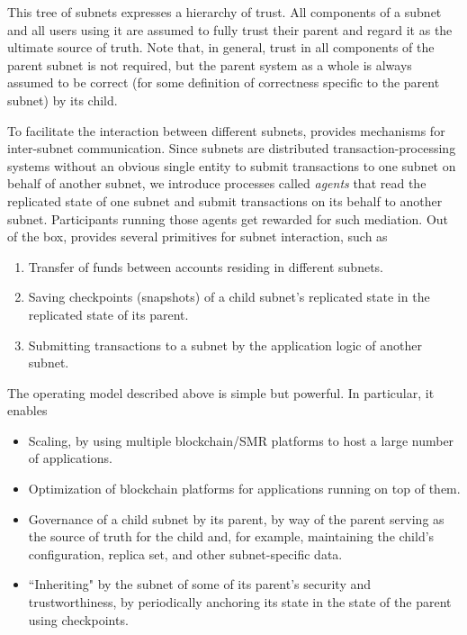 This tree of subnets expresses a hierarchy of trust.
All components of a subnet and all users using it are assumed to fully trust their parent  and regard it as the ultimate source of truth.
Note that, in general, trust in all components of the parent subnet is not required, but the parent system as a whole is always assumed to be correct (for some definition of correctness specific to the parent subnet) by its child.

To facilitate the interaction between different subnets, \ipc provides mechanisms for inter-subnet communication.
Since subnets are distributed transaction-processing systems
without an obvious single entity to submit transactions to one subnet on behalf of another subnet,
we introduce processes called \emph{\ipc agents} that read the replicated state of one subnet and submit transactions on its behalf to another subnet.
Participants running those \ipc agents get rewarded for such mediation.
Out of the box, \ipc provides several primitives for subnet interaction, such as
\begin{enumerate}
    \item Transfer of funds between accounts residing in different subnets.
    \item Saving checkpoints (snapshots) of a child subnet's replicated state in the replicated state of its parent.
    \item Submitting transactions to a subnet by the application logic of another subnet.
\end{enumerate}

The operating model described above is simple but powerful.
In particular, it enables
\begin{itemize}
    \item Scaling, by using multiple blockchain/SMR platforms to host a large number of applications.
    \item Optimization of blockchain platforms for applications running on top of them.
    \item Governance of a child subnet by its parent, by way of the parent serving as the source of truth for the child and, for example, maintaining the child's configuration, replica set, and other subnet-specific data.
    \item ``Inheriting" by the subnet of some of its parent's security and trustworthiness, by periodically anchoring its state in the state of the parent using checkpoints.
\end{itemize}

